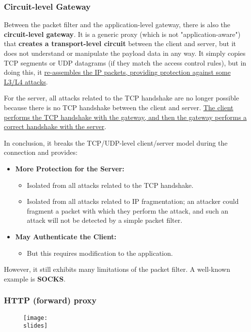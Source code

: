 \subsubsection{Circuit-level Gateway}

Between the packet filter and the application-level gateway, there is also the \textbf{circuit-level gateway}. It is a generic proxy (which is not "application-aware") that \textbf{creates a transport-level circuit} between the client and server, but it does not understand or manipulate the payload data in any way. It simply copies TCP segments or UDP datagrams (if they match the access control rules), but in doing this, it \ul{re-assembles the IP packets, providing protection against some L3/L4 attacks}.

For the server, all attacks related to the TCP handshake are no longer possible because there is no TCP handshake between the client and server. \ul{The client performs the TCP handshake with the gateway, and then the gateway performs a correct handshake with the server}.

In conclusion, it breaks the TCP/UDP-level client/server model during the connection and provides:

\begin{itemize}
    \item \textbf{More Protection for the Server:}
          \begin{itemize}
              \item Isolated from all attacks related to the TCP handshake.
              \item Isolated from all attacks related to IP fragmentation; an attacker could fragment a packet with which they perform the attack, and such an attack will not be detected by a simple packet filter.
          \end{itemize}
    \item \textbf{May Authenticate the Client:}
          \begin{itemize}
              \item But this requires modification to the application.
          \end{itemize}
\end{itemize}

However, it still exhibits many limitations of the packet filter. A well-known example is \textbf{SOCKS}.



\subsubsection{HTTP (forward) proxy}
\begin{figure}[h]
    \centering
    \texttt{[image: \\slides]}
\end{figure}

